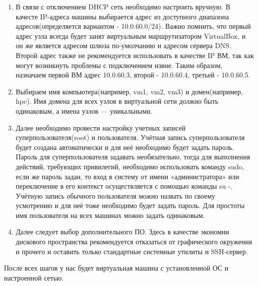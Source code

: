 \documentclass[11pt,a4paper,final]{article}
\begin{document}
\begin{itemize}
	\begin{enumerate}
		\item В связи с отключением DHCP сеть необходимо настроить вручную. В качесте IP-адреса машины выбирается адрес из доступного диапазона адресов(определяется вариантом - 10.0.60.0/24). Важно помнить, что первый адрес узла всегда будет занят виртуальным маршрутизатором VirtualBox, и он же является адресом шлюза по-умолчанию и адресом сервера DNS. Второй адрес также не рекомендуется использовать в качестве IP ВМ, так как могут возникнуть проблемы с подключением извне. Таким образом, назначаем первой ВМ адрес 10.0.60.3, второй - 10.0.60.4, третьей - 10.0.60.5.
		\item Выбираем имя компьютера(например, vm1, vm2, vm3) и домен(например, hpc). Имя домена для всех узлов в виртуальной сети должно быть одинаковым, а имена узлов — уникальными.
		\item Далее необходимо провести настройку учетных записей суперпользователя(root) и пользователя. Учётная запись суперпользователя будет создана автоматически и для неё необходимо будет задать пароль. Пароль для суперпользователя задавать необязательно, тогда для выполнения действий, требующих привилегий, необходимо использовать команду sudo, если же пароль задан, то вход в систему от имени «администратора» или переключение в его контекст осуществляется с помощью команды su -. Учётную запись обычного пользователя можно назвать по своему усмотрению и для неё тоже необходимо будет задать пароль. Для простоты имя пользователя на всех машинах можно задать одинаковым. 
		\item Далее следует выбор дополнительного ПО. Здесь в качестве экономии дискового пространства рекомендуется отказаться от графического окружения и прочего и оставить только стандартные системные утилиты и SSH-сервер.
	\end{enumerate}
\end{itemize}
После всех шагов у нас будет виртуальная машина с установленной ОС и настроенной сетью.
\end{document}
